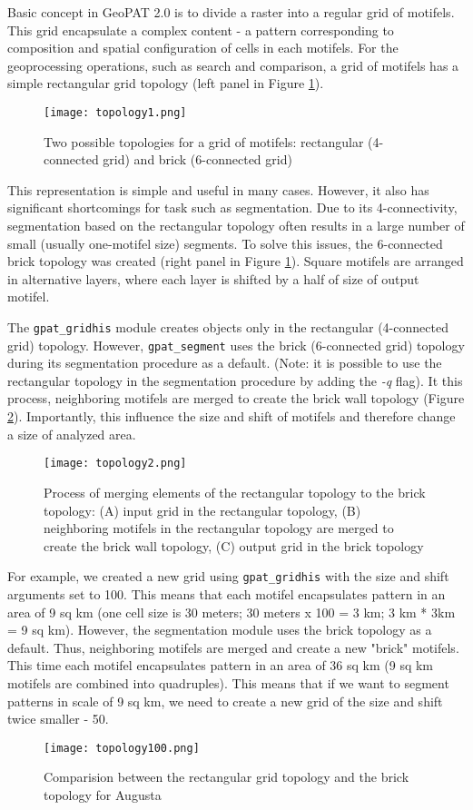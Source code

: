 
Basic concept in GeoPAT 2.0 is to divide a raster into a regular grid of motifels.
This grid encapsulate a complex content - a pattern corresponding to composition and spatial
configuration of cells in each motifels.
For the geoprocessing operations, such as search and comparison, a grid of motifels has a simple rectangular grid topology (left panel in Figure \ref{FIG:TOPO1}). 

\begin{figure}[H]
	\centering
	\texttt{[image: topology1.png]}
	\caption{Two possible topologies for a grid of motifels: rectangular (4-connected grid) and brick (6-connected grid)}
	\label{FIG:TOPO1}
\end{figure}

This representation is simple and useful in many cases.
However, it also has significant shortcomings for task such as segmentation.
Due to its 4-connectivity, segmentation based on the rectangular topology often results in a large number of small (usually one-motifel size) segments.
To solve this issues, the 6-connected brick topology was created (right panel in Figure \ref{FIG:TOPO1}).
Square motifels are arranged in alternative layers, where each layer is shifted by a half of size of output motifel.

The {\tt gpat\_gridhis} module creates objects only in the rectangular (4-connected grid) topology. 
However, {\tt gpat\_segment} uses the brick (6-connected grid) topology during its segmentation procedure as a default.
(Note: it is possible to use the rectangular topology in the segmentation procedure by adding the {\it -q} flag).
It this process, neighboring motifels are merged to create the brick wall topology (Figure \ref{FIG:TOPO2}).
Importantly, this influence the size and shift of motifels and therefore change a size of analyzed area.

\begin{figure}[H]
	\centering
	\texttt{[image: topology2.png]}
	\caption{Process of merging elements of the rectangular topology to the brick topology: (A) input grid in the rectangular topology, (B) neighboring motifels in the rectangular topology are merged to create the brick wall topology, (C) output grid in the brick topology}
	\label{FIG:TOPO2}
\end{figure}

For example, we created a new grid using {\tt gpat\_gridhis} with the size and shift arguments set to 100.
This means that each motifel encapsulates pattern in an area of 9 sq km (one cell size is 30 meters; 30 meters x 100 = 3 km; 3 km * 3km = 9 sq km).
However, the segmentation module uses the brick topology as a default.
Thus, neighboring motifels are merged and create a new "brick" motifels.
This time each motifel encapsulates pattern in an area of 36 sq km (9 sq km motifels are combined into quadruples).
This means that if we want to segment patterns in scale of 9 sq km, we need to create a new grid of the size and shift twice smaller - 50.

\begin{figure}[H]
	\centering
	\texttt{[image: topology100.png]}
	\caption{Comparision between the rectangular grid topology and the brick topology for Augusta}
	\label{FIG:TOPO3}
\end{figure}


